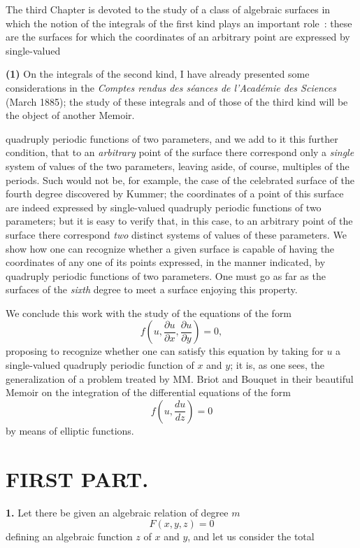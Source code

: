 \documentclass{article}
\begin{document}
The third Chapter is devoted to the study of a class of algebraic surfaces in which the notion of the integrals of the first kind plays an important role~: these are the surfaces for which the coordinates of an arbitrary point are expressed by single-valued

\textbf{(1)} On the integrals of the second kind, I have already presented some considerations in the \emph{Comptes rendus des séances de l'Académie des Sciences} (March 1885); the study of these integrals and of those of the third kind will be the object of another Memoir.


quadruply periodic functions of two parameters, and we add to it this further condition, that to an \emph{arbitrary} point of the surface there correspond only a \emph{single} system of values of the two parameters, leaving aside, of course, multiples of the periods. Such would not be, for example, the case of the celebrated surface of the fourth degree discovered by Kummer; the coordinates of a point of this surface are indeed expressed by single-valued quadruply periodic functions of two parameters; but it is easy to verify that, in this case, to an arbitrary point of the surface there correspond \emph{two} distinct systems of values of these parameters. We show how one can recognize whether a given surface is capable of having the coordinates of any one of its points expressed, in the manner indicated, by quadruply periodic functions of two parameters. One must go as far as the surfaces of the \emph{sixth} degree to meet a surface enjoying this property.

We conclude this work with the study of the equations of the form
\[
f\left(u, \frac{\partial u}{\partial x}, \frac{\partial u}{\partial y}\right) = 0,
\]
proposing to recognize whether one can satisfy this equation by taking for $u$ a single-valued quadruply periodic function of $x$ and $y$; it is, as one sees, the generalization of a problem treated by MM. Briot and Bouquet in their beautiful Memoir on the integration of the differential equations of the form
\[
f\left(u, \frac{du}{dz}\right) = 0
\]
by means of elliptic functions.

\section*{FIRST PART.}

\textbf{1.} Let there be given an algebraic relation of degree $m$
\[
F(x, y, z) = 0
\]
defining an algebraic function $z$ of $x$ and $y$, and let us consider the total
\end{document}
